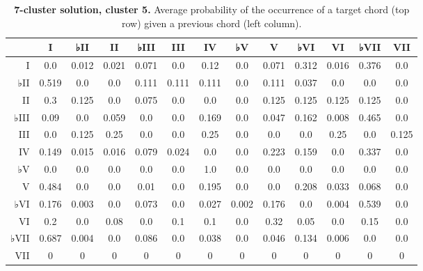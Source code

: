 \begin{table}[htbp]
\begin{minipage}{\linewidth}
\setlength{\tymax}{0.5\linewidth}
\centering
\small
\caption{\textbf{7-cluster solution, cluster 5.} Average probability of the occurrence of a target chord (top row) given a previous chord (left column).}
\label{7-clustersolutioncluster5.averageprobabilityoftheoccurrenceofatargetchordtoprowgivenapreviouschordleftcolumn.}
\begin{tabulary}{\textwidth}{@{}RCCCCCCCCCCCC@{}} \toprule
&I&♭II&II&♭III&III&IV&♭V&V&♭VI&VI&♭VII&VII\\
\midrule
I&0.0&0.012&0.021&0.071&0.0&0.12&0.0&0.071&0.312&0.016&0.376&0.0\\
♭II&0.519&0.0&0.0&0.111&0.111&0.111&0.0&0.111&0.037&0.0&0.0&0.0\\
II&0.3&0.125&0.0&0.075&0.0&0.0&0.0&0.125&0.125&0.125&0.125&0.0\\
♭III&0.09&0.0&0.059&0.0&0.0&0.169&0.0&0.047&0.162&0.008&0.465&0.0\\
III&0.0&0.125&0.25&0.0&0.0&0.25&0.0&0.0&0.0&0.25&0.0&0.125\\
IV&0.149&0.015&0.016&0.079&0.024&0.0&0.0&0.223&0.159&0.0&0.337&0.0\\
♭V&0.0&0.0&0.0&0.0&0.0&1.0&0.0&0.0&0.0&0.0&0.0&0.0\\
V&0.484&0.0&0.0&0.01&0.0&0.195&0.0&0.0&0.208&0.033&0.068&0.0\\
♭VI&0.176&0.003&0.0&0.073&0.0&0.027&0.002&0.176&0.0&0.004&0.539&0.0\\
VI&0.2&0.0&0.08&0.0&0.1&0.1&0.0&0.32&0.05&0.0&0.15&0.0\\
♭VII&0.687&0.004&0.0&0.086&0.0&0.038&0.0&0.046&0.134&0.006&0.0&0.0\\
VII&0&0&0&0&0&0&0&0&0&0&0&0\\

\bottomrule

\end{tabulary}
\end{minipage}
\end{table}

